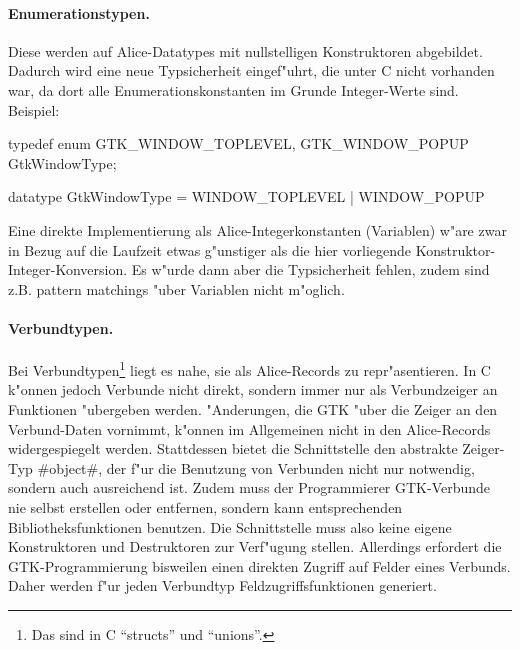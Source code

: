 \documentclass[a4paper,titlepage]{article}
\newcommand{\doparskip}{\bigskip}
\newenvironment{code}{\verbatim}{\endverbatim}
\begin{document}
\paragraph{Enumerationstypen.}

Diese werden auf Alice-Datatypes mit nullstelligen
Konstruktoren abgebildet. Dadurch wird eine neue Typsicherheit eingef"uhrt,
die unter C nicht vorhanden war, da dort alle Enumerationskonstanten im Grunde
Integer-Werte sind. Beispiel:
\doparskip

\begin{minipage}[t]{5cm}
\begin{code}
typedef enum {
  GTK_WINDOW_TOPLEVEL,
  GTK_WINDOW_POPUP
} GtkWindowType;
\end{code}
\end{minipage}
\begin{minipage}[t]{5cm}
\begin{code}
datatype GtkWindowType =
  WINDOW_TOPLEVEL
| WINDOW_POPUP
\end{code}
\end{minipage}\doparskip

Eine direkte Implementierung als Alice-Integerkonstanten (Variablen)
w"are zwar in Bezug auf die Laufzeit etwas g"unstiger als die hier vorliegende
Konstruktor-Integer-Konversion. Es w"urde dann aber die Typsicherheit fehlen,
zudem sind z.B. pattern matchings "uber Variablen nicht m"oglich.

\paragraph{Verbundtypen.}

Bei Verbundtypen\footnote{Das sind in C ``structs'' und ``unions''.} 
liegt es nahe, sie als Alice-Records zu repr"asentieren. 
In C k"onnen jedoch Verbunde nicht direkt, sondern immer nur als Verbundzeiger
an Funktionen "ubergeben werden. "Anderungen, die GTK "uber die Zeiger
an den Verbund-Daten vornimmt, k"onnen im Allgemeinen nicht in den
Alice-Records widergespiegelt werden.
Stattdessen bietet die Schnittstelle den abstrakte Zeiger-Typ #object#,
der f"ur die Benutzung von Verbunden nicht nur notwendig, sondern auch
ausreichend ist.
Zudem muss der Programmierer GTK-Verbunde nie selbst
erstellen oder entfernen, sondern kann entsprechenden Bibliotheksfunktionen
benutzen.
Die Schnittstelle muss also keine eigene Konstruktoren und Destruktoren
zur Verf"ugung stellen.
Allerdings erfordert die GTK-Programmierung bisweilen einen direkten
Zugriff auf Felder eines Verbunds. Daher werden f"ur jeden
Verbundtyp Feldzugriffsfunktionen generiert.
\end{document}
